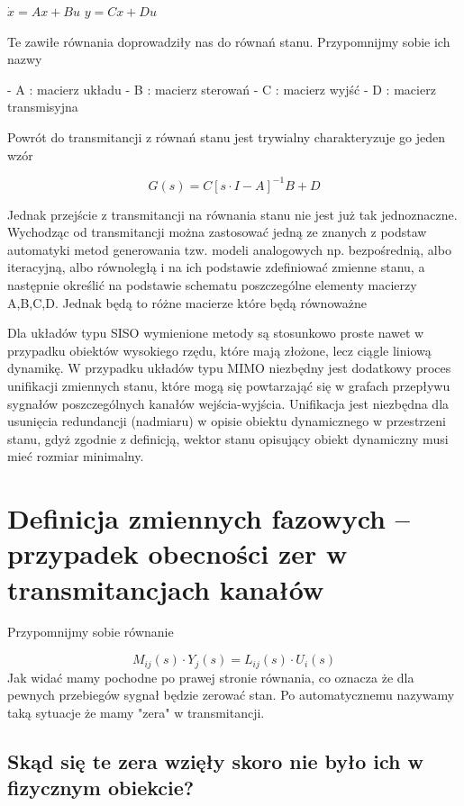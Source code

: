 \documentclass{article}
\begin{document}
		$ \dot{x} = Ax + Bu $
		$ y       = Cx + Du $

		Te zawiłe równania doprowadziły nas do równań stanu. Przypomnijmy sobie ich nazwy

		- A : macierz układu
		- B : macierz sterowań
		- C : macierz wyjść
		- D : macierz transmisyjna

		Powrót do transmitancji z równań stanu jest trywialny
		charakteryzuje go jeden wzór

		\begin{equation}
			G(s) = C[s \cdot I - A]^{-1}B + D
		\end{equation}

		Jednak przejście z transmitancji na równania stanu nie jest już tak jednoznaczne.
		Wychodząc od transmitancji można zastosować jedną ze znanych z podstaw
		automatyki metod generowania tzw. modeli analogowych
		np. bezpośrednią, albo iteracyjną, albo równoległą i na ich podstawie
		zdefiniować zmienne stanu, a następnie określić na podstawie schematu poszczególne
		elementy macierzy A,B,C,D.
		Jednak będą to różne macierze które będą równoważne

		Dla układów typu SISO wymienione metody są stosunkowo proste nawet w przypadku
		obiektów wysokiego rzędu, które mają złożone, lecz ciągle liniową dynamikę.
		W przypadku układów typu MIMO niezbędny jest dodatkowy proces unifikacji
		zmiennych stanu, które mogą się powtarzająć się w grafach przepływu sygnałów
		poszczególnych kanałów wejścia-wyjścia. Unifikacja jest niezbędna dla usunięcia
		redundancji (nadmiaru) w opisie obiektu dynamicznego w przestrzeni stanu, gdyż
		zgodnie z definicją, wektor stanu opisujący obiekt dynamiczny musi
		mieć rozmiar minimalny.

	\section{Definicja zmiennych fazowych – przypadek obecności zer w transmitancjach kanałów}

	Przypomnijmy sobie równanie

	\begin{equation}
		 M_{ij}(s) \cdot Y_{j}(s) = L_{ij}(s) \cdot U_{i}(s) 
	\end{equation}
	Jak widać mamy pochodne po prawej stronie równania, co oznacza że dla pewnych
	przebiegów sygnał będzie zerować stan.
	Po automatycznemu nazywamy taką sytuacje że mamy "zera" w transmitancji.

	\subsection{Skąd się te zera wzięły skoro nie było ich w fizycznym obiekcie?}
\end{document}
